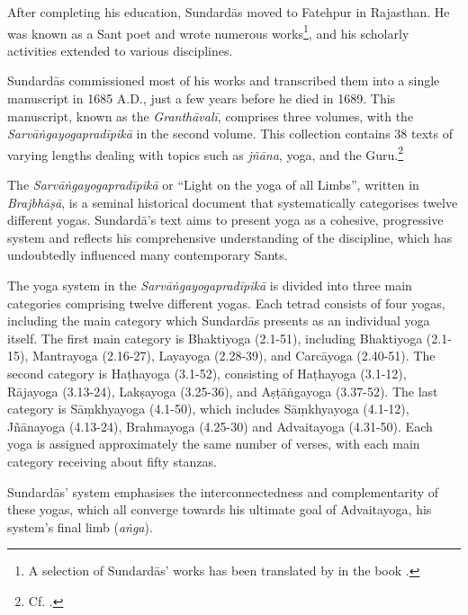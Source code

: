 After completing his education, Sundardās moved to Fatehpur in Rajasthan. He was known as a Sant poet and wrote numerous works\footnote{A selection of Sundardās' works has been translated by \citeauthor{horstmann2023shrine} in the book .}, and his scholarly activities extended to various disciplines.

Sundardās commissioned most of his works and transcribed them into a single manuscript in 1685 A.D., just a few years before he died in 1689. This manuscript, known as the \emph{Granthāvalī}, comprises three volumes, with the \emph{Sarvāṅgayogapradīpikā} in the second volume. This collection contains 38 texts of varying lengths dealing with topics such as \textit{jñāna}, yoga, and the Guru.\footnote{Cf. \citeauthor[2014: 685]{burger2014sarvangayogapradipika}.}

The \emph{Sarvāṅgayogapradīpikā} or ``Light on the yoga of all Limbs'', written in \textit{Brajbhāṣā}, is a seminal historical document that systematically categorises twelve different yogas. Sundardā's text aims to present yoga as a cohesive, progressive system and reflects his comprehensive understanding of the discipline, which has undoubtedly influenced many contemporary Sants.

The yoga system in the \emph{Sarvāṅgayogapradīpikā} is divided into three main categories comprising twelve different yogas. Each tetrad consists of four yogas, including the main category which Sundardās presents as an individual yoga itself.  The first main category is Bhaktiyoga (2.1-51), including Bhaktiyoga (2.1-15), Mantrayoga (2.16-27), Layayoga (2.28-39), and Carcāyoga (2.40-51). The second category is Haṭhayoga (3.1-52), consisting of Haṭhayoga (3.1-12), Rājayoga (3.13-24), Lakṣayoga (3.25-36), and Aṣṭāṅgayoga (3.37-52). The last category is Sāṃkhyayoga (4.1-50), which includes Sāṃkhyayoga (4.1-12), Jñānayoga (4.13-24), Brahmayoga (4.25-30) and Advaitayoga (4.31-50). Each yoga is assigned approximately the same number of verses, with each main category receiving about fifty stanzas.

Sundardās' system emphasises the interconnectedness and complementarity of these yogas, which all converge towards his ultimate goal of Advaitayoga, his system's final limb (\textit{aṅga}).  

